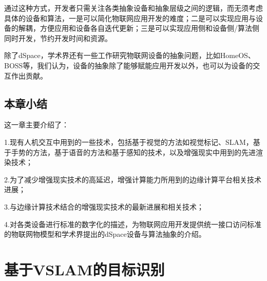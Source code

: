 通过这种方式，开发者只需关注各类抽象设备和抽象层级之间的逻辑，而无须考虑具体的设备和算法，一是可以简化物联网应用开发的难度；二是可以实现应用与设备的解耦，方便应用和设备各自迭代更新；三是可以实现应用侧和设备侧/算法侧同时开发，节约开发时间和资源。

除了dSpace，学术界还有一些工作研究物联网设备的抽象问题，比如HomeOS\cite{DixMahAga10}、BOSS\cite{DawKriTan13}等，我们认为，设备的抽象除了能够赋能应用开发以外，也可以为设备的交互作出贡献。

\section{本章小结}
这一章主要介绍了：

1.现有人机交互中用到的一些技术，包括基于视觉的方法如视觉标记、SLAM，基于手势的方法，基于语音的方法和基于感知的技术，以及增强现实中用到的先进渲染技术；

2.为了减少增强现实技术的高延迟，增强计算能力所用到的边缘计算平台相关技术进展；

3.与边缘计算技术结合的增强现实技术的最新进展和相关技术；

4.对各类设备进行标准的数字化的描述，为物联网应用开发提供统一接口访问标准的物联网物模型和学术界提出的dSpace设备与算法抽象的介绍。









\chapter{基于VSLAM的目标识别}
\label{chap:vslam}

